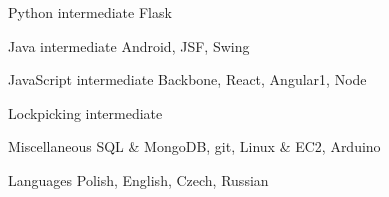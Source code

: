 
\begin{cvskills}

	\cvskill
		{Python}
		{intermediate}
		{Flask}

	\cvskill
		{Java}
		{intermediate}
		{Android, JSF, Swing}

	\cvskill
		{JavaScript}
		{intermediate}
		{Backbone, React, Angular1, Node}

	\cvskill
		{Lockpicking}
		{intermediate}
		{}

	\cvskill
		{Miscellaneous}
		{}
		{SQL \& MongoDB, git, Linux \& EC2, Arduino}

	\cvskill
		{Languages}
		{}
		{Polish, English, Czech, Russian}

\end{cvskills}

